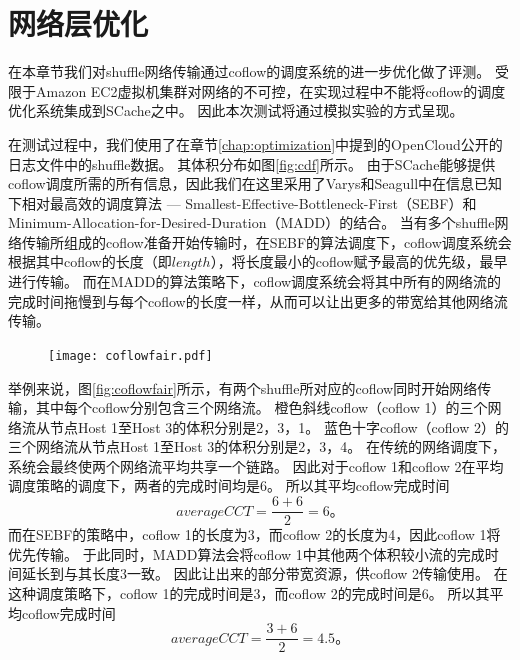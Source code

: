 \section{网络层优化}

在本章节我们对shuffle网络传输通过coflow的调度系统的进一步优化做了评测。
受限于Amazon EC2虚拟机集群对网络的不可控，在实现过程中不能将coflow的调度优化系统集成到SCache之中。
因此本次测试将通过模拟实验的方式呈现。

在测试过程中，我们使用了在章节\ref{chap:optimization}中提到的OpenCloud公开的日志文件中的shuffle数据。
其体积分布如图\ref{fig:cdf}所示。
由于SCache能够提供coflow调度所需的所有信息，因此我们在这里采用了Varys\cite{varys}和Seagull\cite{seagull}中在信息已知下相对最高效的调度算法 ---
Smallest-Effective-Bottleneck-First（SEBF）和Minimum-Allocation-for-Desired-Duration（MADD）的结合。
当有多个shuffle网络传输所组成的coflow准备开始传输时，在SEBF的算法调度下，coflow调度系统会根据其中coflow的长度（即$length$），将长度最小的coflow赋予最高的优先级，最早进行传输。
而在MADD的算法策略下，coflow调度系统会将其中所有的网络流的完成时间拖慢到与每个coflow的长度一样，从而可以让出更多的带宽给其他网络流传输。

\begin{figure}[!htp]
	\centering
	\texttt{[image: coflowfair.pdf]}
\end{figure}

举例来说，图\ref{fig:coflowfair}所示，有两个shuffle所对应的coflow同时开始网络传输，其中每个coflow分别包含三个网络流。
橙色斜线coflow（coflow 1）的三个网络流从节点Host 1至Host 3的体积分别是2，3，1。
蓝色十字coflow（coflow 2）的三个网络流从节点Host 1至Host 3的体积分别是2，3，4。
在传统的网络调度下，系统会最终使两个网络流平均共享一个链路。
因此对于coflow 1和coflow 2在平均调度策略的调度下，两者的完成时间均是6。
所以其平均coflow完成时间
\begin{equation}
    average CCT = \frac{6 + 6}{2} = 6。
\end{equation}
而在SEBF的策略中，coflow 1的长度为3，而coflow 2的长度为4，因此coflow 1将优先传输。
于此同时，MADD算法会将coflow 1中其他两个体积较小流的完成时间延长到与其长度3一致。
因此让出来的部分带宽资源，供coflow 2传输使用。
在这种调度策略下，coflow 1的完成时间是3，而coflow 2的完成时间是6。
所以其平均coflow完成时间
\begin{equation}
    average CCT = \frac{3 + 6}{2} = 4.5。
\end{equation}

